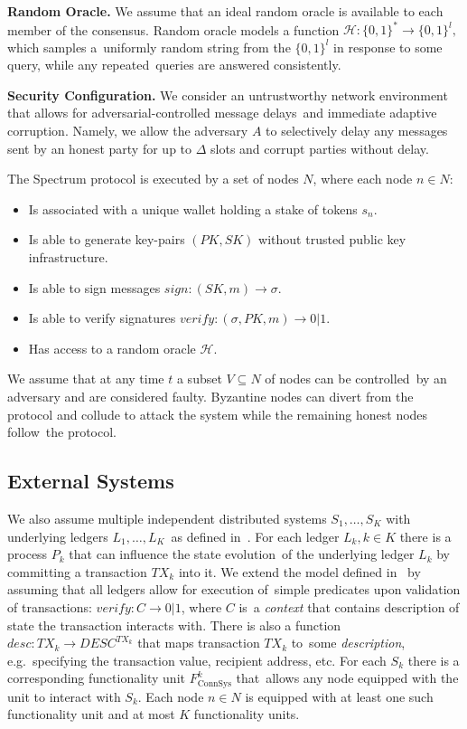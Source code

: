 \textbf{Random Oracle.}
We assume that an ideal random oracle is available to each member of the consensus.
Random oracle models a function ${\mathcal{H} : \{0, 1\}^* \rightarrow \{0, 1\}^l, }$ which samples a\
uniformly random string from the ${\{0, 1\}^l}$ in response to some query, while any repeated\
queries are answered consistently.

\textbf{Security Configuration.}
We consider an untrustworthy network environment that allows for adversarial-controlled message delays\
and immediate adaptive corruption.
Namely, we allow the adversary $A$ to selectively delay any messages sent
by an honest party for up to $\Delta$ slots and corrupt parties without delay.

The Spectrum protocol is executed by a set of nodes $N$, where each node $n \in N$:
\begin{itemize}
    \item Is associated with a unique wallet holding a stake of tokens $s_n$.
    \item Is able to generate key-pairs ${(PK, SK)}$ without trusted public key infrastructure.
    \item Is able to sign messages ${sign: (SK, m) \rightarrow \sigma}$.
    \item Is able to verify signatures ${verify: (\sigma, PK, m) \rightarrow 0 | 1}$.
    \item Has access to a random oracle $\mathcal{H}$.
\end{itemize}

We assume that at any time $t$ a subset ${V \subseteq N}$ of nodes can be controlled\
by an adversary and are considered faulty.
Byzantine nodes can divert from the protocol and collude to attack the system while the remaining honest nodes follow\
the protocol.

\subsection{External Systems}\label{subsec:external-systems.}
We also assume multiple independent distributed systems ${S_1, \dots, S_K}$ with underlying ledgers ${L_1, \dots, L_K}$\
as defined in~\cite{cryptoeprint:2019/1128}.
For each ledger ${L_k, k \in K}$ there is a process $P_k$ that can influence the state evolution\
of the underlying ledger $L_k$ by committing a transaction $TX_k$ into it.
We extend the model defined in~\cite{cryptoeprint:2019/1128} by assuming that all ledgers allow for execution of\
simple predicates upon validation of transactions: ${verify: C \rightarrow 0 | 1}$, where $C$ is\
a \emph{context} that contains description of state the transaction interacts with.
There is also a function ${desc: TX_k \rightarrow DESC^{TX_k}}$ that maps transaction $TX_k$ to\
some \emph{description}, e.g.\ specifying the transaction value, recipient address, etc.
For each $S_k$ there is a corresponding functionality unit $F^k_{\text{ConnSys}}$ that\
allows any node equipped with the unit to interact with $S_k$.
Each node $n \in N$ is equipped with at least one such functionality unit and at most $K$ functionality units.

